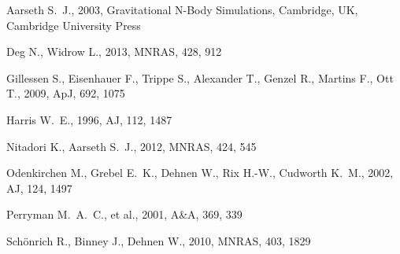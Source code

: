 Aarseth S.~J., 2003, Gravitational N-Body Simulations, Cambridge, UK, Cambridge University Press 

Deg N., Widrow L., 2013, MNRAS, 428, 912 

Gillessen S., Eisenhauer F., Trippe S., Alexander T., Genzel R., Martins F., Ott T., 2009, ApJ, 692, 1075 

Harris W.~E., 1996, AJ, 112, 1487 

Nitadori K., Aarseth S.~J., 2012, MNRAS, 424, 545 

Odenkirchen M., Grebel E.~K., Dehnen W., Rix H.-W., Cudworth K.~M., 2002, AJ, 124, 1497 

Perryman M.~A.~C., et al., 2001, A\&A, 369, 339 

Sch{\"o}nrich R., Binney J., Dehnen W., 2010, MNRAS, 403, 1829 

